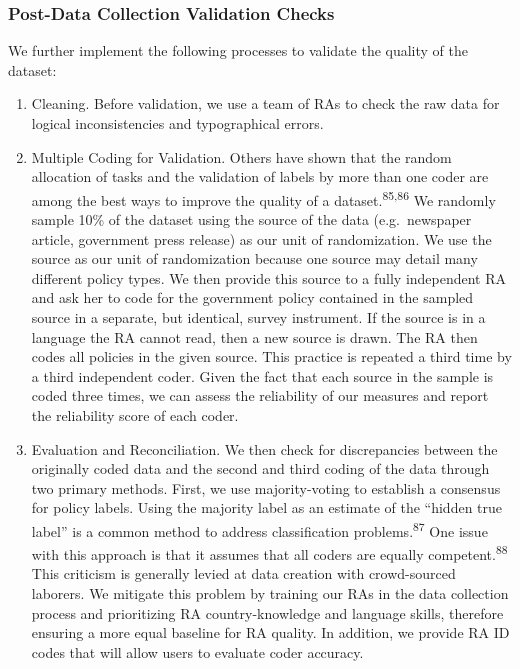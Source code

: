 \documentclass[
]{article}
\begin{document}
\hypertarget{post-data-collection-validation-checks}{%
\subsubsection*{Post-Data Collection Validation Checks}\label{post-data-collection-validation-checks}}

We further implement the following processes to validate the quality of the dataset:

\begin{enumerate}
\def\labelenumi{\arabic{enumi}.}
\item
  Cleaning. Before validation, we use a team of RAs to check the raw data for logical inconsistencies and typographical errors.
\item
  Multiple Coding for Validation. Others have shown that the random allocation of tasks and the validation of labels by more than one coder are among the best ways to improve the quality of a dataset.\textsuperscript{85,86} We randomly sample 10\% of the dataset using the source of the data (e.g.~newspaper article, government press release) as our unit of randomization. We use the source as our unit of randomization because one source may detail many different policy types. We then provide this source to a fully independent RA and ask her to code for the government policy contained in the sampled source in a separate, but identical, survey instrument. If the source is in a language the RA cannot read, then a new source is drawn. The RA then codes all policies in the given source. This practice is repeated a third time by a third independent coder. Given the fact that each source in the sample is coded three times, we can assess the reliability of our measures and report the reliability score of each coder.
\item
  Evaluation and Reconciliation. We then check for discrepancies between the originally coded data and the second and third coding of the data through two primary methods. First, we use majority-voting to establish a consensus for policy labels. Using the majority label as an estimate of the ``hidden true label'' is a common method to address classification problems.\textsuperscript{87} One issue with this approach is that it assumes that all coders are equally competent.\textsuperscript{88} This criticism is generally levied at data creation with crowd-sourced laborers. We mitigate this problem by training our RAs in the data collection process and prioritizing RA country-knowledge and language skills, therefore ensuring a more equal baseline for RA quality. In addition, we provide RA ID codes that will allow users to evaluate coder accuracy.
\end{enumerate}
\end{document}
